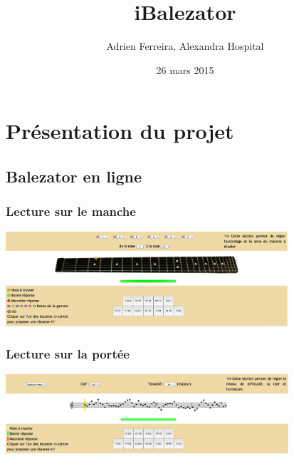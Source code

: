 \documentclass{beamer}
\title{iBalezator}
\author{Adrien Ferreira, Alexandra Hospital}
\institute{PSAR - UPMC}
\date{26 mars 2015}
\begin{document}
   \begin{frame}

      \titlepage

   \end{frame}






\section{Présentation du projet}

	\subsection{Balezator en ligne}

	\begin{frame}

		\frametitle{Lecture sur le manche}
			\includegraphics[width=10.5cm]{images/balezator_manche.png}
	\end{frame}

	\begin{frame}

		\frametitle{Lecture sur la portée}
			\includegraphics[width=10.5cm]{images/balezator_portee.png}

	\end{frame}
\end{document}

